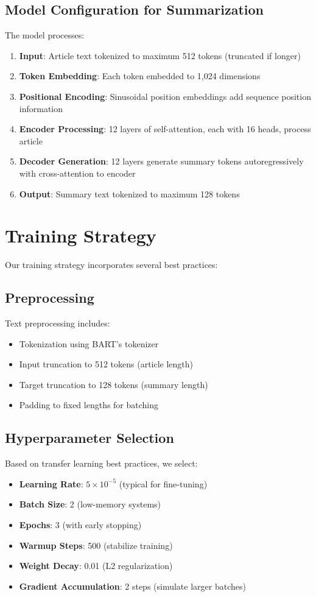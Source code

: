 \documentclass[12pt,a4paper,oneside]{report}
\begin{document}
\subsection{Model Configuration for Summarization}
The model processes:
\begin{enumerate}
    \item \textbf{Input}: Article text tokenized to maximum 512 tokens (truncated if longer)
    \item \textbf{Token Embedding}: Each token embedded to 1,024 dimensions
    \item \textbf{Positional Encoding}: Sinusoidal position embeddings add sequence position information
    \item \textbf{Encoder Processing}: 12 layers of self-attention, each with 16 heads, process article
    \item \textbf{Decoder Generation}: 12 layers generate summary tokens autoregressively with cross-attention to encoder
    \item \textbf{Output}: Summary text tokenized to maximum 128 tokens
\end{enumerate}

\section{Training Strategy}
Our training strategy incorporates several best practices:

\subsection{Preprocessing}
Text preprocessing includes:
\begin{itemize}
    \item Tokenization using BART's tokenizer
    \item Input truncation to 512 tokens (article length)
    \item Target truncation to 128 tokens (summary length)
    \item Padding to fixed lengths for batching
\end{itemize}

\subsection{Hyperparameter Selection}
Based on transfer learning best practices, we select:
\begin{itemize}
    \item \textbf{Learning Rate}: $5 \times 10^{-5}$ (typical for fine-tuning)
    \item \textbf{Batch Size}: 2 (low-memory systems)
    \item \textbf{Epochs}: 3 (with early stopping)
    \item \textbf{Warmup Steps}: 500 (stabilize training)
    \item \textbf{Weight Decay}: 0.01 (L2 regularization)
    \item \textbf{Gradient Accumulation}: 2 steps (simulate larger batches)
\end{itemize}
\end{document}
